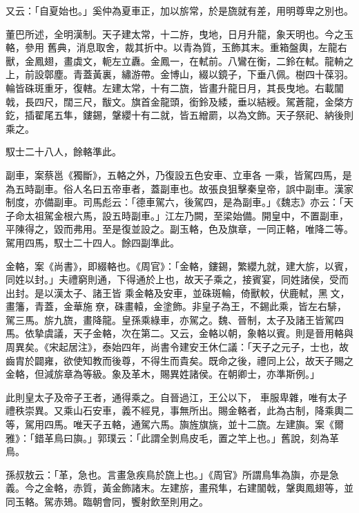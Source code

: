 \begin{pinyinscope}
 又云：「自夏始也。」奚仲為夏車正，加以旂常，於是旒就有差，用明尊卑之別也。



 董巴所述，全明漢制。天子建太常，十二斿，曳地，日月升龍，象天明也。今之玉輅，參用
 舊典，消息取舍，裁其折中。以青為質，玉飾其末。重箱盤輿，左龍右獸，金鳳翅，畫虡文，軛左立纛。金鳳一，在軾前。八鸞在衡，二鈴在軾。龍輈之上，前設鄣塵。青蓋黃裏，繡游帶。金博山，綴以鏡子，下垂八佩。樹四十葆羽。輪皆硃斑重牙，復轄。左建太常，十有二旒，皆畫升龍日月，其長曳地。右載闟戟，長四尺，闊三尺，黻文。旗首金龍頭，銜鈴及緌，垂以結綬。駕蒼龍，金棨方釳，插翟尾五隼，鏤錫，鞶纓十有二就，皆五繒罽，以為文飾。天子祭祀、納後則乘之。



 馭士二十八人，餘輅準此。



 副車，案蔡邕《獨斷》，五輅之外，乃復設五色安車、立車各
 一乘，皆駕四馬，是為五時副車。俗人名曰五帝車者，蓋副車也。故張良狙擊秦皇帝，誤中副車。漢家制度，亦備副車。司馬彪云：「德車駕六，後駕四，是為副車。」《魏志》亦云：「天子命太祖駕金根六馬，設五時副車。」江左乃闕，至梁始備。開皇中，不置副車，平陳得之，毀而弗用。至是復並設之。副玉輅，色及旗章，一同正輅，唯降二等。駕用四馬，馭士二十四人。餘四副準此。



 金輅，案《尚書》，即綴輅也。《周官》：「金輅，鏤錫，繁纓九就，建大旂，以賓，同姓以封。」夫禮窮則通，下得通於上也，故天子乘之，接賓宴，同姓諸侯，受而出封。是以漢太子、諸王皆
 乘金輅及安車，並硃斑輪，倚獸較，伏鹿軾，黑𣝛文，畫籓，青蓋，金華施尞，硃畫轅，金塗飾。非皇子為王，不錫此乘，皆左右騑，駕三馬。旂九旒，畫降龍。皇孫乘綠車，亦駕之。魏、晉制，太子及諸王皆駕四馬。依摯虞議，天子金輅，次在第二。又云，金輅以朝，象輅以賓。則是晉用輅與周異矣。《宋起居注》，泰始四年，尚書令建安王休仁議：「天子之元子，士也，故齒胄於闢雍，欲使知教而後尊，不得生而貴矣。既命之後，禮同上公，故天子賜之金輅，但減旂章為等級。象及革木，賜異姓諸侯。在朝卿士，亦準斯例。」



 此則皇太子及帝子王者，通得乘之。自晉過江，王公以下，
 車服卑雜，唯有太子禮秩崇異。又乘山石安車，義不經見，事無所出。賜金輅者，此為古制，降乘輿二等，駕用四馬。唯天子五輅，通駕六馬。旟旌旗旐，並十二旒。左建旟。案《爾雅》：「錯革鳥曰旟。」郭璞云：「此謂全剝鳥皮毛，置之竿上也。」舊說，刻為革鳥。



 孫叔敖云：「革，急也。言畫急疾鳥於旒上也。」《周官》所謂鳥隼為旟，亦是急義。今之金輅，赤質，黃金飾諸末。左建旂，畫飛隼，右建闟戟，鞶輿鳳翅等，並同玉輅。駕赤鳷。臨朝會同，饗射飲至則用之。




\end{pinyinscope}
